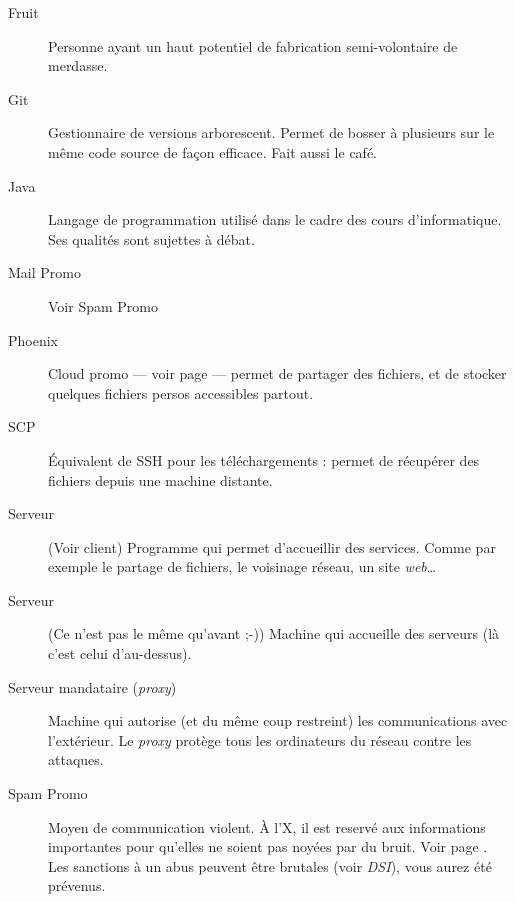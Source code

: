 \begin{description}
  \item[Fruit] Personne ayant un haut potentiel de fabrication semi-volontaire de merdasse.%

  \item[Git] Gestionnaire de versions arborescent. Permet de bosser à plusieurs sur le même code source de façon efficace. Fait aussi le café.
  

  
   \item[Java] Langage de programmation utilisé dans le cadre des cours d'informatique. Ses qualités sont sujettes à débat.
   
   \item[Mail Promo] Voir Spam Promo
   
  \item[Phoenix] Cloud promo — voir page \pageref{phoenix} — permet de partager des fichiers, et de stocker quelques fichiers persos accessibles partout.
  
  \item[SCP] Équivalent de SSH pour les téléchargements : permet de récupérer des fichiers depuis une machine distante.
  
  \item[Serveur] (Voir client) Programme qui permet d'accueillir des services. Comme par exemple le partage de fichiers, le voisinage réseau, un site \emph{web}\ldots\

  \item[Serveur] (Ce n'est pas le même qu'avant ;-)) Machine qui accueille des serveurs (là c'est celui d'au-dessus).
  
  \item[Serveur mandataire (\emph{proxy})] Machine qui autorise
(et du même coup restreint) les communications avec l'extérieur. Le \emph{proxy} protège tous les ordinateurs du réseau contre les attaques.

  \item[Spam Promo] Moyen de communication violent. À l'X, il est reservé aux informations importantes pour qu'elles ne soient pas noyées par du bruit. Voir page \pageref{mails}. Les sanctions à un abus peuvent être brutales (voir \emph{DSI}), vous aurez été prévenus.
  

\end{description}
